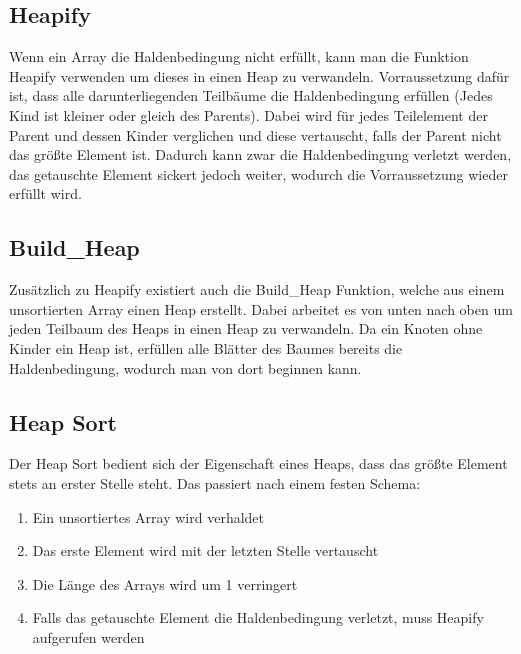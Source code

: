 \documentclass{article}
\begin{document}
	\subsection{Heapify}
	Wenn ein Array die Haldenbedingung nicht erfüllt, kann man die Funktion Heapify verwenden um dieses in einen Heap zu verwandeln. Vorraussetzung dafür ist, dass alle darunterliegenden Teilbäume die Haldenbedingung erfüllen (Jedes Kind ist kleiner oder gleich des Parents). Dabei wird für jedes Teilelement der Parent und dessen Kinder verglichen und diese vertauscht, falls der Parent nicht das größte Element ist. Dadurch kann zwar die Haldenbedingung verletzt werden, das getauschte Element sickert jedoch weiter, wodurch die Vorraussetzung wieder erfüllt wird.
	\subsection{\texorpdfstring{Build\_Heap}{Build Heap}}
	Zusätzlich zu Heapify existiert auch die Build\_Heap Funktion, welche aus einem unsortierten Array einen Heap erstellt. Dabei arbeitet es von unten nach oben um jeden Teilbaum des Heaps in einen Heap zu verwandeln. Da ein Knoten ohne Kinder ein Heap ist, erfüllen alle Blätter des Baumes bereits die Haldenbedingung, wodurch man von dort beginnen kann.
	\subsection{Heap Sort}
	Der Heap Sort bedient sich der Eigenschaft eines Heaps, dass das größte Element stets an erster Stelle steht. Das passiert nach einem festen Schema:
	\begin{enumerate}
		\item{Ein unsortiertes Array wird verhaldet}
		\item{Das erste Element wird mit der letzten Stelle vertauscht}
		\item{Die Länge des Arrays wird um 1 verringert}
		\item{Falls das getauschte Element die Haldenbedingung verletzt, muss Heapify aufgerufen werden}
	\end{enumerate}
\end{document}
